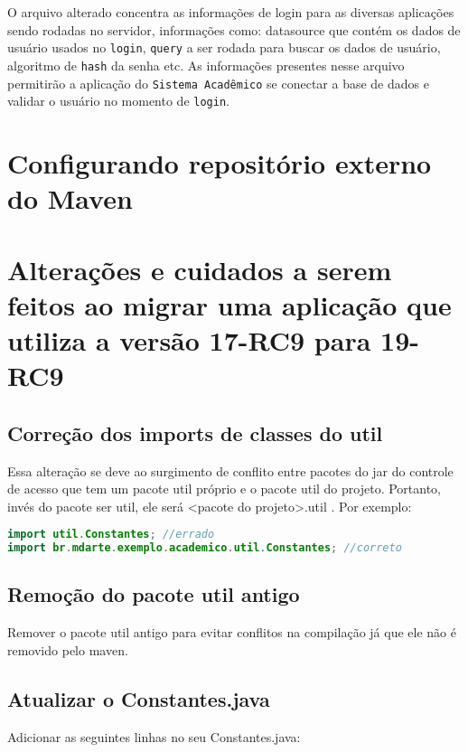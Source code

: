 \begin{framed}
	
\end{framed}

O arquivo alterado concentra as informações de login para as diversas aplicações
sendo rodadas no servidor, informações como: datasource que contém os dados de
usuário usados no \texttt{login}, \texttt{query} a ser rodada para buscar os
dados de usuário, algoritmo de \texttt{hash} da senha etc. As informações
presentes nesse arquivo permitirão a aplicação do \texttt{Sistema Acadêmico} se
conectar a base de dados e validar o usuário no momento de \texttt{login}.

\chapter{Configurando repositório externo do Maven}
\label{maven-config}

\chapter{Alterações e cuidados a serem feitos ao migrar uma aplicação que
utiliza a versão 17-RC9 para 19-RC9}

\section{Correção dos imports de classes do util}
Essa alteração se deve ao surgimento de conflito entre pacotes do jar do
controle de acesso que tem um pacote util próprio e o pacote util do projeto. Portanto, invés do pacote ser util, ele será <pacote do projeto>.util . Por exemplo:

\begin{framed}
\begin{lstlisting}[language=java, breakline=true]
import util.Constantes; //errado
import br.mdarte.exemplo.academico.util.Constantes; //correto
\end{lstlisting}
\end{framed}

\section{Remoção do pacote util antigo}
Remover o pacote util antigo para evitar conflitos na compilação já que ele não
é removido pelo maven.

\section{Atualizar o Constantes.java}
Adicionar as seguintes linhas no seu Constantes.java:

